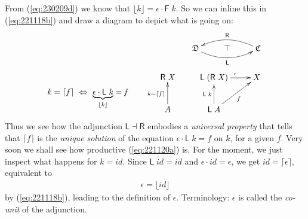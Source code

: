 \documentclass{elsarticle}
\newcommand{\Conid}[1]{\mathit{#1}}
\newcommand{\Varid}[1]{\mathit{#1}}
\def\myxym#1{\vcenter{\xymatrix{#1}}}
\def\comp{ \mathbin{\cdot} }
\def\fun#1{\mathsf{#1}}
\def\wider#1{~ #1 ~}
\def\cat#1{{\mathfrak #1}}
\def\emskip{\vskip 1em\noindent }
\def\equiv{\Leftrightarrow}
\begin{document}
From (\ref{eq:230209d}) we know that \ensuremath{\lfloor \Varid{k}\rfloor\mathrel{=}\epsilon  \comp \fun F \;\Varid{k}}. So we can inline this in (\ref{eq:221118b}) and
draw a diagram to depict what is going on:
\begin{eqnarray}
&& \rule{2em}{0pt}
\myxym{
	\ensuremath{\cat{D}}
		\ar@/_0.9pc/[rr]_-{\ensuremath{\fun L }}
&
		\top
&
	\ensuremath{\cat{C}}
		\ar@/_0.9pc/[ll]_-{\ensuremath{\fun R }}
}
\nonumber
\\
		\ensuremath{\Varid{k}\mathrel{=}\lceil \Varid{f}\rceil}
		\wider\equiv
		\ensuremath{\underbrace{\epsilon  \comp \fun L \;\Varid{k}}_{\lfloor \Varid{k}\rfloor}\mathrel{=}\Varid{f}}
		& \rule{1em}{0pt}&
		\myxym{
			\ensuremath{\fun R \;\Conid{X}}
				&
				\ensuremath{\fun L \;(\fun R \;\Conid{X})}
				\ar[r]^{\ensuremath{\epsilon }}
			&
				X
				\\
				A
				\ar[u]^{\ensuremath{\Varid{k}\mathrel{=}\lceil \Varid{f}\rceil}}
			&
				\ensuremath{\fun L \;\Conid{A}}
				\ar[u]^{\ensuremath{\fun L \;\Varid{k}}}
			\ar[ru]_{f}
		}
\label{eq:221120a}
\end{eqnarray}
Thus we see how the adjunction \ensuremath{\fun L \mathbin\dashv \fun R } embodies a \emph{universal property} that tells that
\ensuremath{\lceil \Varid{f}\rceil} is the \emph{unique solution} of the equation \ensuremath{\epsilon  \comp \fun L \;\Varid{k}\mathrel{=}\Varid{f}} on \ensuremath{\Varid{k}}, for a given \ensuremath{\Varid{f}}.
Very soon we shall see 
how productive (\ref{eq:221120a}) is. For the moment, we just inspect what happens for \ensuremath{\Varid{k}\mathrel{=}{id}}. Since \ensuremath{\fun L \;{id}\mathrel{=}{id}} and \ensuremath{\epsilon  \comp {id}\mathrel{=}\epsilon }, we get \ensuremath{{id}\mathrel{=}\lceil \epsilon \rceil}, equivalent to 
\begin{eqnarray}
\ensuremath{\epsilon \mathrel{=}\lfloor {id}\rfloor}
\end{eqnarray}
by (\ref{eq:221118b}), leading to the definition of \ensuremath{\epsilon }.
Terminology: \ensuremath{\epsilon } is called the \emph{co-unit} of the adjunction.
\end{document}
